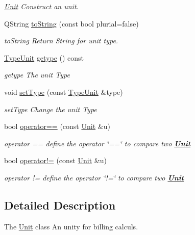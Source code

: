 \begin{DoxyCompactItemize}
\begin{DoxyCompactList}\small\item\em \hyperlink{classModels_1_1Unit}{Unit} Construct an unit. \end{DoxyCompactList}\item 
Q\+String \hyperlink{classModels_1_1Unit_a0eeeb628ada11c3809e82634ea24e2a7}{to\+String} (const bool plurial=false)
\begin{DoxyCompactList}\small\item\em to\+String Return String for unit type. \end{DoxyCompactList}\item 
\hyperlink{namespaceModels_a999532b323a4b63ff54013326c83f040}{Type\+Unit} \hyperlink{classModels_1_1Unit_aa7aa58c11b9464c99595ccc755fcf7c6}{getype} () const 
\begin{DoxyCompactList}\small\item\em getype The unit Type \end{DoxyCompactList}\item 
void \hyperlink{classModels_1_1Unit_ad7e3209d943fb8ee06b5d132173710c5}{set\+Type} (const \hyperlink{namespaceModels_a999532b323a4b63ff54013326c83f040}{Type\+Unit} \&type)
\begin{DoxyCompactList}\small\item\em set\+Type Change the unit Type \end{DoxyCompactList}\item 
bool \hyperlink{classModels_1_1Unit_a4554ce9d88e0ded72688e8085f5feb3f}{operator==} (const \hyperlink{classModels_1_1Unit}{Unit} \&u)
\begin{DoxyCompactList}\small\item\em operator == define the operator \char`\"{}==\char`\"{} to compare two {\bfseries \hyperlink{classModels_1_1Unit}{Unit}} \end{DoxyCompactList}\item 
bool \hyperlink{classModels_1_1Unit_a3fda8038ee8876979b40895c6de7fc49}{operator!=} (const \hyperlink{classModels_1_1Unit}{Unit} \&u)
\begin{DoxyCompactList}\small\item\em operator != define the operator \char`\"{}!=\char`\"{} to compare two {\bfseries \hyperlink{classModels_1_1Unit}{Unit}} \end{DoxyCompactList}\end{DoxyCompactItemize}


\subsection{Detailed Description}
The \hyperlink{classModels_1_1Unit}{Unit} class An unity for billing calculs. 

